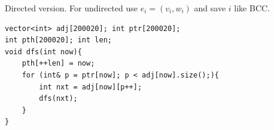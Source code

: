 Directed version. For undirected use $e_i = (v_i, w_i)$ and save $i$ like BCC.
\begin{verbatim}
vector<int> adj[200020]; int ptr[200020];
int pth[200020]; int len;
void dfs(int now){
	pth[++len] = now;
	for (int& p = ptr[now]; p < adj[now].size();){
		int nxt = adj[now][p++];
		dfs(nxt);
	}
}
\end{verbatim}